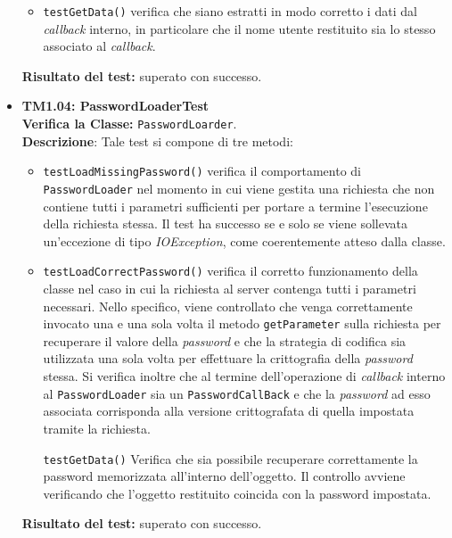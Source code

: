 \begin{itemize}
\begin{itemize}
\item \texttt{testGetData()} verifica che siano estratti in modo corretto i dati dal \textit{callback} interno, in particolare che il nome utente restituito sia lo stesso associato al \textit{callback}.

\end{itemize}
\textbf{Risultato del test:} superato con successo.

\item \textbf{TM1.04: PasswordLoaderTest}\\
\textbf{Verifica la Classe:} \texttt{PasswordLoarder}.\\
\textbf{Descrizione}: %
Tale test si compone di tre metodi:
\begin{itemize}

\item \texttt{testLoadMissingPassword()} verifica il comportamento di \texttt{PasswordLoader} nel momento in cui viene gestita una richiesta che non contiene tutti i parametri sufficienti per portare a termine l'esecuzione della richiesta stessa. Il test ha successo se e solo se viene sollevata un'eccezione di tipo \textit{IOException}, come coerentemente atteso dalla classe.

\item \texttt{testLoadCorrectPassword()} verifica il corretto funzionamento della classe nel caso in cui la richiesta al server contenga tutti i parametri necessari. Nello specifico, viene controllato che venga correttamente invocato una e una sola volta il metodo \texttt{getParameter} sulla richiesta per recuperare il valore della \textit{password} e che la strategia di codifica sia utilizzata una sola volta per effettuare la crittografia della \textit{password} stessa. Si verifica inoltre che al termine dell'operazione di \textit{callback} interno al \texttt{PasswordLoader} sia un \texttt{PasswordCallBack} e che la \textit{password} ad esso associata corrisponda alla versione crittografata di quella impostata tramite la richiesta.

\texttt{testGetData()} Verifica che sia possibile recuperare correttamente la password memorizzata all'interno dell'oggetto.
Il controllo avviene verificando che l'oggetto restituito coincida con la password impostata.
 
\end{itemize}
\textbf{Risultato del test:} superato con successo.



\end{itemize}
